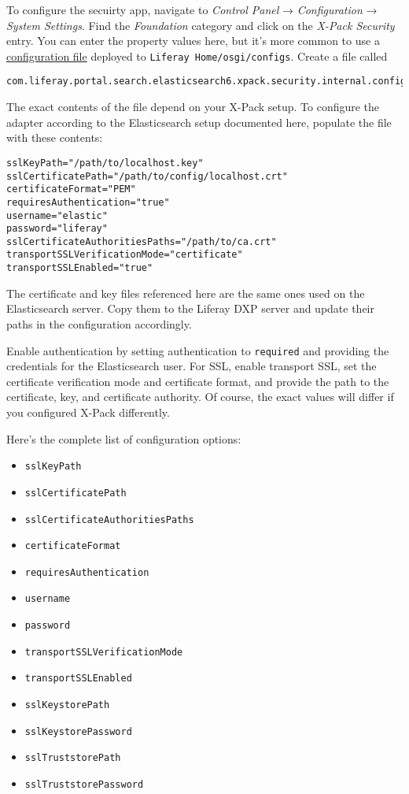 To configure the secuirty app, navigate to \emph{Control Panel} →
\emph{Configuration} → \emph{System Settings}. Find the
\emph{Foundation} category and click on the \emph{X-Pack Security}
entry. You can enter the property values here, but it's more common to
use a
\href{/docs/7-0/user/-/knowledge_base/u/understanding-system-configuration-files}{configuration
file} deployed to \texttt{Liferay\ Home/osgi/configs}. Create a file
called

\begin{verbatim}
com.liferay.portal.search.elasticsearch6.xpack.security.internal.configuration.XPackSecurityConfiguration.config
\end{verbatim}

The exact contents of the file depend on your X-Pack setup. To configure
the adapter according to the Elasticsearch setup documented here,
populate the file with these contents:

\begin{verbatim}
sslKeyPath="/path/to/localhost.key"
sslCertificatePath="/path/to/config/localhost.crt"
certificateFormat="PEM"
requiresAuthentication="true"
username="elastic"
password="liferay"
sslCertificateAuthoritiesPaths="/path/to/ca.crt"
transportSSLVerificationMode="certificate"
transportSSLEnabled="true"
\end{verbatim}

The certificate and key files referenced here are the same ones used on
the Elasticsearch server. Copy them to the Liferay DXP server and update
their paths in the configuration accordingly.

Enable authentication by setting authentication to \texttt{required} and
providing the credentials for the Elasticsearch user. For SSL, enable
transport SSL, set the certificate verification mode and certificate
format, and provide the path to the certificate, key, and certificate
authority. Of course, the exact values will differ if you configured
X-Pack differently.

Here's the complete list of configuration options:

\begin{itemize}
\tightlist
\item
  \texttt{sslKeyPath}
\item
  \texttt{sslCertificatePath}
\item
  \texttt{sslCertificateAuthoritiesPaths}
\item
  \texttt{certificateFormat}
\item
  \texttt{requiresAuthentication}
\item
  \texttt{username}
\item
  \texttt{password}
\item
  \texttt{transportSSLVerificationMode}
\item
  \texttt{transportSSLEnabled}
\item
  \texttt{sslKeystorePath}
\item
  \texttt{sslKeystorePassword}
\item
  \texttt{sslTruststorePath}
\item
  \texttt{sslTruststorePassword}
\end{itemize}

